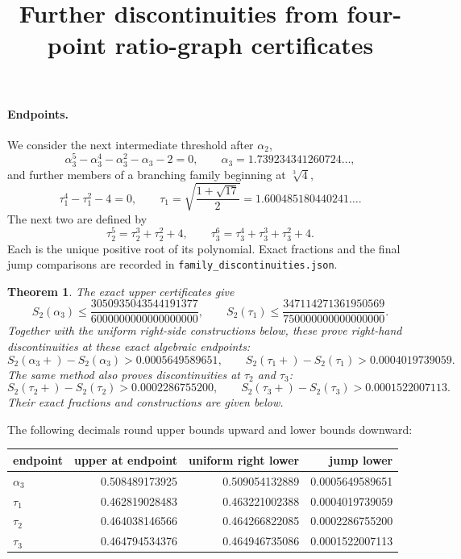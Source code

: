 \documentclass[11pt]{article}
\newtheorem{theorem}{Theorem}
\begin{document}
\title{Further discontinuities from four-point ratio-graph certificates}
\author{}\date{}\maketitle

\paragraph{Endpoints.}
We consider the next intermediate threshold after $\alpha_2$,
\[
\alpha_3^5-\alpha_3^4-\alpha_3^2-\alpha_3-2=0,
\qquad \alpha_3=1.739234341260724\ldots,
\]
and further members of a branching family beginning at $\sqrt[3]4$,
\[
\tau_1^4-\tau_1^2-4=0,\qquad
\tau_1=\sqrt{\frac{1+\sqrt{17}}2}=1.600485180440241\ldots.
\]
The next two are defined by
\[
\tau_2^5=\tau_2^3+\tau_2^2+4,\qquad
\tau_3^6=\tau_3^4+\tau_3^3+\tau_3^2+4.
\]
Each is the unique positive root of its polynomial. Exact fractions and
the final jump comparisons are recorded in \texttt{family\_discontinuities.json}.

\begin{theorem}
The exact upper certificates give
\[
S_2(\alpha_3)\le\frac{3050935043544191377}{6000000000000000000},
\qquad
S_2(\tau_1)\le\frac{347114271361950569}{750000000000000000}.
\]
Together with the uniform right-side constructions below, these prove
right-hand discontinuities at these exact algebraic endpoints:
\[
S_2(\alpha_3+)-S_2(\alpha_3)>0.0005649589651,
\qquad
S_2(\tau_1+)-S_2(\tau_1)>0.0004019739059.
\]
The same method also proves discontinuities at $\tau_2$ and $\tau_3$:
\[
S_2(\tau_2+)-S_2(\tau_2)>0.0002286755200,\qquad
S_2(\tau_3+)-S_2(\tau_3)>0.0001522007113.
\]
Their exact fractions and constructions are given below.
\end{theorem}
The following decimals round upper bounds upward and lower bounds downward:
\begin{center}
\begin{tabular}{lrrr}
\toprule
endpoint&upper at endpoint&uniform right lower&jump lower\\\midrule
$\alpha_3$&0.508489173925&0.509054132889&0.0005649589651\\
$\tau_1$&0.462819028483&0.463221002388&0.0004019739059\\
$\tau_2$&0.464038146566&0.464266822085&0.0002286755200\\
$\tau_3$&0.464794534376&0.464946735086&0.0001522007113\\
\bottomrule
\end{tabular}
\end{center}
\end{document}
